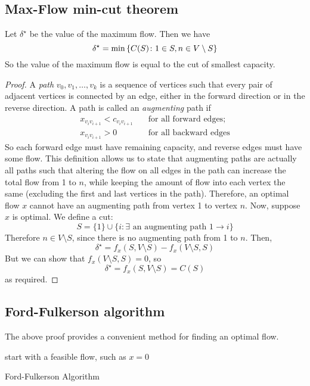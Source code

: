 \subsection{Max-Flow min-cut theorem}
\begin{theorem}
	Let \( \delta^\star \) be the value of the maximum flow.
	Then we have
	\[
		\delta^\star = \min \qty{ C(S) \colon 1 \in S, n \in V \setminus S }
	\]
	So the value of the maximum flow is equal to the cut of smallest capacity.
\end{theorem}
\begin{proof}
	A \textit{path} \( v_0, v_1, \dots, v_k \) is a sequence of vertices such that every pair of adjacent vertices is connected by an edge, either in the forward direction or in the reverse direction.
	A path is called an \textit{augmenting} path if
	\begin{align*}
		x_{v_i v_{i+1}} < c_{v_i v_{i+1}} & \quad \text{for all forward edges}; \\
		x_{v_i v_{i+1}} > 0               & \quad \text{for all backward edges}
	\end{align*}
	So each forward edge must have remaining capacity, and reverse edges must have some flow.
	This definition allows us to state that augmenting paths are actually all paths such that altering the flow on all edges in the path can increase the total flow from 1 to \( n \), while keeping the amount of flow into each vertex the same (excluding the first and last vertices in the path).
	Therefore, an optimal flow \( x \) cannot have an augmenting path from vertex 1 to vertex \( n \).
	Now, suppose \( x \) is optimal.
	We define a cut:
	\[
		S = \{ 1 \} \cup \{ i \colon \exists \text{ an augmenting path } 1 \to i \}
	\]
	Therefore \( n \in V \setminus S \), since there is no augmenting path from 1 to \( n \).
	Then,
	\[
		\delta^\star = f_x(S, V \setminus S) - f_x(V \setminus S, S)
	\]
	But we can show that \( f_x(V \setminus S, S) = 0 \), so
	\[
		\delta^\star = f_x(S, V \setminus S) = C(S)
	\]
	as required.
\end{proof}

\subsection{Ford-Fulkerson algorithm}
The above proof provides a convenient method for finding an optimal flow.

\begin{algorithm*}[H]
	\SetAlgoLined{}
	start with a feasible flow, such as \(x = 0\)\;
	\caption{Ford-Fulkerson Algorithm}
\end{algorithm*}

